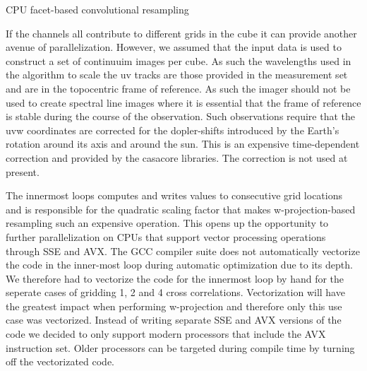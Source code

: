 \begin{algorithm}
\begin{algorithmic}
	      \ENDFOR
	    \ENDFOR
	  \ENDIF
	\ENDFOR
      \ENDFOR
    \ENDFOR
  \ENDFOR
 \end{algorithmic}
 \caption{CPU facet-based convolutional resampling}
 \label{ALG_GRIDDING_CPU}
\end{algorithm}

If the channels all contribute to different grids in the cube it can provide another avenue of parallelization. However, we assumed that the input data is used to
construct a set of continuuim images per cube. As such the wavelengths used in the algorithm to scale the uv tracks are those provided in the measurement set and are in the topocentric
frame of reference. As such the imager should not be used to create spectral line images where it is essential that the frame of reference is stable during the course of the observation.
Such observations require that the uvw coordinates are corrected for the dopler-shifts introduced by the Earth's rotation around its axis and around the sun. This is an expensive time-dependent
correction and provided by the casacore libraries. The correction is not used at present.

The innermost loops computes and writes values to consecutive grid locations and is responsible for the quadratic scaling factor that makes w-projection-based resampling such an expensive operation. 
This opens up the opportunity to further parallelization on CPUs that support vector processing operations through SSE and AVX. The GCC compiler suite does not automatically vectorize the code in the inner-most 
loop during automatic optimization due to its depth. We therefore had to vectorize the code for the innermost loop by hand for the seperate cases of gridding 1, 2 and 4 cross correlations. Vectorization will have
the greatest impact when performing w-projection and therefore only this use case was vectorized. Instead of writing separate SSE and AVX versions of the code we decided to only support modern processors that include the 
AVX instruction set. Older processors can be targeted during compile time by turning off the vectorizated code.

